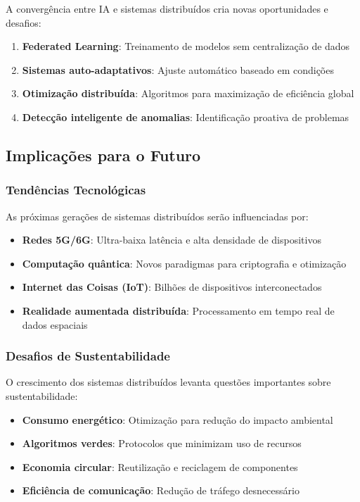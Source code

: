 A convergência entre IA e sistemas distribuídos cria novas oportunidades e desafios:

\begin{enumerate}
    \item \textbf{Federated Learning}: Treinamento de modelos sem centralização de dados
    \item \textbf{Sistemas auto-adaptativos}: Ajuste automático baseado em condições
    \item \textbf{Otimização distribuída}: Algoritmos para maximização de eficiência global
    \item \textbf{Detecção inteligente de anomalias}: Identificação proativa de problemas
\end{enumerate}

\subsection{Implicações para o Futuro}

\subsubsection{Tendências Tecnológicas}

As próximas gerações de sistemas distribuídos serão influenciadas por:

\begin{itemize}
    \item \textbf{Redes 5G/6G}: Ultra-baixa latência e alta densidade de dispositivos
    \item \textbf{Computação quântica}: Novos paradigmas para criptografia e otimização
    \item \textbf{Internet das Coisas (IoT)}: Bilhões de dispositivos interconectados
    \item \textbf{Realidade aumentada distribuída}: Processamento em tempo real de dados espaciais
\end{itemize}

\subsubsection{Desafios de Sustentabilidade}

O crescimento dos sistemas distribuídos levanta questões importantes sobre sustentabilidade:

\begin{itemize}
    \item \textbf{Consumo energético}: Otimização para redução do impacto ambiental
    \item \textbf{Algoritmos verdes}: Protocolos que minimizam uso de recursos
    \item \textbf{Economia circular}: Reutilização e reciclagem de componentes
    \item \textbf{Eficiência de comunicação}: Redução de tráfego desnecessário
\end{itemize}

